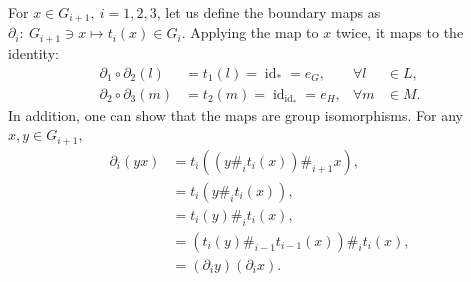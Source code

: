 \documentclass[11pt, reqno]{amsart} %
\newcommand{\id}{{\mathop{\mathrm{id}}}}
\theoremstyle{definition}
\theoremstyle{remark}
\numberwithin{equation}{section}
\begin{document}
For $x\in G_{i+1},\ i=1,2,3$, let us define the boundary maps as $\partial_i:~G_{i+1}\ni x \mapsto t_i(x)\in G_i$. Applying the map to $x$ twice, it maps to the identity:
\begin{align}
  \label{eq:p1p2=e}
  \partial_1\circ\partial_2(l) &= t_1(l) = \id_* = e_G, &\forall l&\in L, \\
  \label{eq:p2p3=e}
  \partial_2\circ\partial_3(m) &= t_2(m) = \id_{\id_*} = e_H, &\forall m&\in M.
\end{align}
In addition, one can show that the maps are group isomorphisms. For any $x,y\in G_{i+1}$, 
\begin{align*}
  \partial_i(yx) 
  &= t_i((y\#_it_i(x))\#_{i+1}x), \\
  &= t_i(y\#_it_i(x)), \\
  &= t_i(y)\#_it_i(x), \\
  &= (t_i(y)\#_{i-1}t_{i-1}(x))\#_it_i(x), \\
  &= (\partial_iy)(\partial_ix).
\end{align*}
\end{document}
